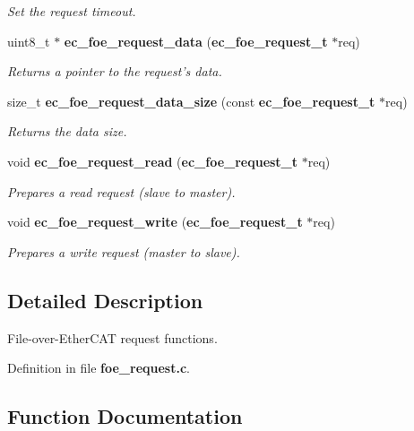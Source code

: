 \begin{DoxyCompactItemize}
\begin{DoxyCompactList}\small\item\em \-Set the request timeout. \end{DoxyCompactList}\item 
uint8\-\_\-t $\ast$ {\bf ec\-\_\-foe\-\_\-request\-\_\-data} ({\bf ec\-\_\-foe\-\_\-request\-\_\-t} $\ast$req)
\begin{DoxyCompactList}\small\item\em \-Returns a pointer to the request's data. \end{DoxyCompactList}\item 
size\-\_\-t {\bf ec\-\_\-foe\-\_\-request\-\_\-data\-\_\-size} (const {\bf ec\-\_\-foe\-\_\-request\-\_\-t} $\ast$req)
\begin{DoxyCompactList}\small\item\em \-Returns the data size. \end{DoxyCompactList}\item 
void {\bf ec\-\_\-foe\-\_\-request\-\_\-read} ({\bf ec\-\_\-foe\-\_\-request\-\_\-t} $\ast$req)
\begin{DoxyCompactList}\small\item\em \-Prepares a read request (slave to master). \end{DoxyCompactList}\item 
void {\bf ec\-\_\-foe\-\_\-request\-\_\-write} ({\bf ec\-\_\-foe\-\_\-request\-\_\-t} $\ast$req)
\begin{DoxyCompactList}\small\item\em \-Prepares a write request (master to slave). \end{DoxyCompactList}\end{DoxyCompactItemize}


\subsection{\-Detailed \-Description}
\-File-\/over-\/\-Ether\-C\-A\-T request functions. 

\-Definition in file {\bf foe\-\_\-request.\-c}.



\subsection{\-Function \-Documentation}
